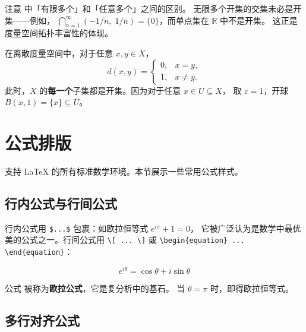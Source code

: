 \begin{remark}
注意  中「有限多个」和「任意多个」之间的区别。
无限多个开集的交集未必是开集——例如，
$\bigcap_{n=1}^{\infty} (-1/n,\; 1/n) = \{0\}$，而单点集在 $\mathbb{R}$ 中不是开集。
这正是度量空间拓扑丰富性的体现。
\end{remark}

\begin{example}[离散度量空间中的开集]
在离散度量空间中，对于任意 $x, y \in X$，
\[
d(x, y) = \begin{cases}
    0, & x = y, \\
    1, & x \neq y.
\end{cases}
\]
此时，$X$ 的\textbf{每一个}子集都是开集。因为对于任意 $x \in U \subseteq X$，
取 $\varepsilon = 1$，开球 $B(x, 1) = \{x\} \subseteq U$。
\end{example}

\section{公式排版}

 支持 \LaTeX{} 的所有标准数学环境。本节展示一些常用公式样式。

\subsection{行内公式与行间公式}

行内公式用 \lstinline|$...$| 包裹：如欧拉恒等式 $e^{i\pi} + 1 = 0$，
它被广泛认为是数学中最优美的公式之一。行间公式用 \lstinline|\[ ... \]| 或
\lstinline|\begin{equation} ... \end{equation}|：

\begin{equation}
    e^{i\theta} = \cos\theta + i\sin\theta
    \label{eq:euler}
\end{equation}


公式  被称为\textbf{欧拉公式}，它是复分析中的基石。
当 $\theta = \pi$ 时，即得欧拉恒等式。

\subsection{多行对齐公式}


